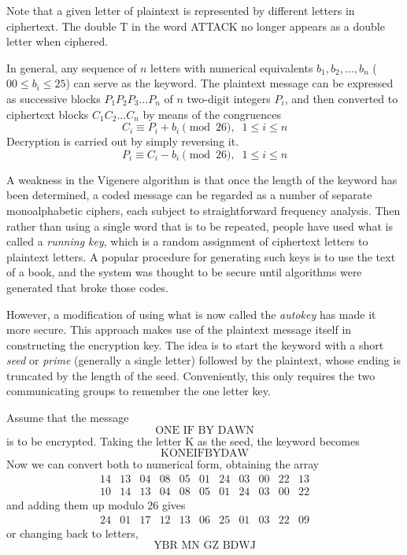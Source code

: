 \documentclass{article}
\theoremstyle{remark}
\theoremstyle{definition}
\begin{document}
Note that a given letter of plaintext is represented by different letters in ciphertext. The double T in the word ATTACK no longer appears as a double letter when ciphered. 

In general, any sequence of $n$ letters with numerical equivalents $b_1, b_2, ..., b_n$ ($00\leq b_i \leq 25$) can serve as the keyword. The plaintext message can be expressed as successive blocks $P_1 P_2 P_3 ... P_n$ of $n$ two-digit integers $P_i$, and then converted to ciphertext blocks $C_1 C_2 ... C_n$ by means of the congruences 
\[C_i \equiv P_i + b_i \pmod{26}, \;\; 1 \leq i \leq n\]
Decryption is carried out by simply reversing it. 
\[P_i \equiv C_i - b_i \pmod{26}, \;\; 1 \leq i \leq n\]

A weakness in the Vigenere algorithm is that once the length of the keyword has been determined, a coded message can be regarded as a number of separate monoalphabetic ciphers, each subject to straightforward frequency analysis. Then rather than using a single word that is to be repeated, people have used what is called a \textit{running key}, which is a random assignment of ciphertext letters to plaintext letters. A popular procedure for generating such keys is to use the text of a book, and the system was thought to be secure until algorithms were generated that broke those codes. 

However, a modification of using what is now called the \textit{autokey} has made it more secure. This approach makes use of the plaintext message itself in constructing the encryption key. The idea is to start the keyword with a short \textit{seed} or \textit{prime} (generally a single letter) followed by the plaintext, whose ending is truncated by the length of the seed. Conveniently, this only requires the two communicating groups to remember the one letter key. 

Assume that the message 
\[\text{ONE IF BY DAWN}\] 
is to be encrypted. Taking the letter K as the seed, the keyword becomes
\[\text{KONEIFBYDAW}\]
Now we can convert both to numerical form, obtaining the array
\[\begin{array}{ccccccccccc}
    14&13&04&08&05&01&24&03&00&22&13\\
    10&14&13&04&08&05&01&24&03&00&22
\end{array}\]
and adding them up modulo $26$ gives
\[\begin{array}{ccccccccccc}
     24&01&17&12&13&06&25&01&03&22&09
\end{array}\]
or changing back to letters, 
\[\text{YBR MN GZ BDWJ}\]
\end{document}
